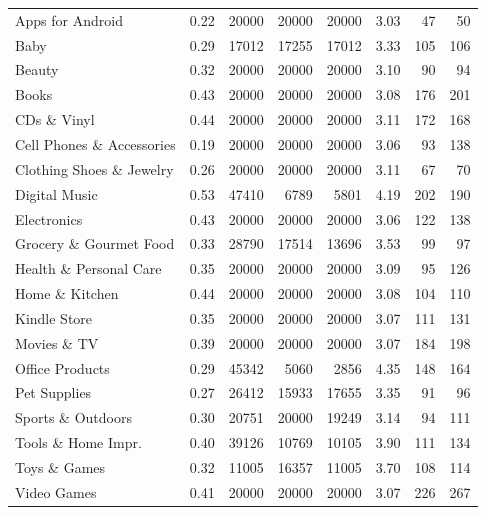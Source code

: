 \begin{table}
\begin{tabularx}{\textwidth}{lXrrrcrr}
		\midrule
		Apps for Android            &   0.22 &   20000 &  	20000 & 20000 &    3.03 &     47 &   50 \\
		Baby                        &   0.29 & 	17012 &  	17255 &  	17012 &    3.33 &    105 &  106 \\
		Beauty                      &   0.32 &   20000 &  	20000 & 20000 &    3.10 &     90 &   94 \\
		Books                       &   0.43 &   20000 &  	20000 & 20000 &    3.08 &    176 &  201 \\
		CDs \& Vinyl                &   0.44 &   20000 &  	20000 & 20000 &    3.11 &    172 &  168 \\
		Cell Phones \& Accessories  &   0.19 &   20000 &  	20000 & 20000 &    3.06 &     93 &  138 \\
		Clothing Shoes \& Jewelry   &   0.26&   20000 &  	20000 & 20000 &    3.11 &     67 &   70 \\
		Digital Music               &   0.53 &  47410 &  	6789 &  5801 &    4.19 &    202 &  190 \\
		Electronics                 &   0.43 &   20000 &  	20000 & 20000 &    3.06 &    122 &  138 \\
		Grocery \& Gourmet Food     &   0.33 &  28790 & 17514 & 13696 &    3.53 &    99  &   97 \\
		Health \& Personal Care     &   0.35 &   20000 &  	20000 & 20000 &    3.09 &     95 &  126 \\
		Home \& Kitchen             &   0.44 &   20000 &  	20000 & 20000 &    3.08 &    104 &  110 \\
		Kindle Store                &   0.35 &   20000 &  	20000 & 20000 &    3.07 &    111 &  131 \\
		Movies \& TV                &   0.39 &   20000 &  	20000 & 20000 &    3.07 &    184 &  198 \\
		Office Products             &   0.29 &  45342 &  5060 & 2856 &    4.35 &    148 &  164 \\
		Pet Supplies                &   0.27 &  26412 & 15933 & 17655 &    3.35 &     91 &   96 \\
		Sports \& Outdoors          &   0.30 &  20751 & 20000 & 19249 &    3.14 &     94 &  111 \\
		Tools \& Home Impr.  		&   0.40 &  39126 & 10769 & 10105 &    3.90 &    111 &  134 \\
		Toys \& Games               &   0.32 &  11005 & 16357 & 11005 &    3.70 &    108 &  114 \\
		Video Games                 &   0.41 &   20000 &  	20000 & 20000 &    3.07 &    226 &  267 \\

\end{tabularx}
\end{table}
